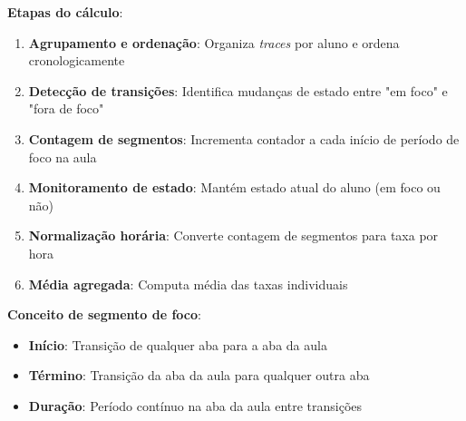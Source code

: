 % 

\textbf{Etapas do cálculo}:
\begin{enumerate}
    \item \textbf{Agrupamento e ordenação}: Organiza \textit{traces} por aluno e ordena cronologicamente
    \item \textbf{Detecção de transições}: Identifica mudanças de estado entre "em foco" e "fora de foco"
    \item \textbf{Contagem de segmentos}: Incrementa contador a cada início de período de foco na aula
    \item \textbf{Monitoramento de estado}: Mantém estado atual do aluno (em foco ou não)
    \item \textbf{Normalização horária}: Converte contagem de segmentos para taxa por hora
    \item \textbf{Média agregada}: Computa média das taxas individuais
\end{enumerate}

\textbf{Conceito de segmento de foco}:
\begin{itemize}
    \item \textbf{Início}: Transição de qualquer aba para a aba da aula
    \item \textbf{Término}: Transição da aba da aula para qualquer outra aba
    \item \textbf{Duração}: Período contínuo na aba da aula entre transições
\end{itemize}
